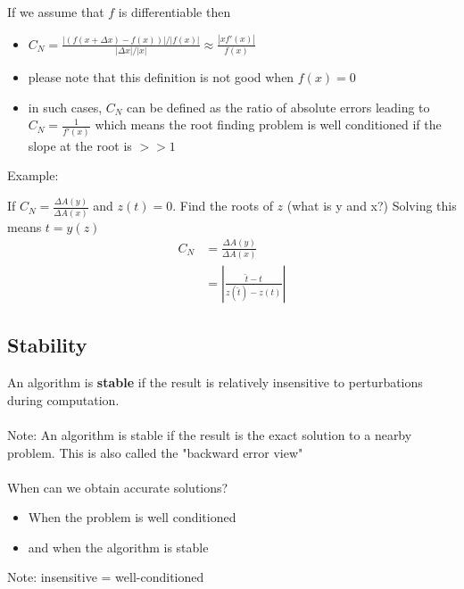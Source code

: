 \documentclass[12pt]{article}
\begin{document}
If we assume that $f$ is differentiable then

\begin{itemize}
    \item $C_N = \frac{|(f(x + \Delta x) - f(x))| / |f(x)|}{|
    \Delta x|/ |x|} \approx \frac{|xf'(x)|}{f(x)}$
    \item please note that this definition is not good when $f(x) = 0$
    \item in such cases, $C_N$ can be defined as the ratio of absolute errors leading to $C_N = \frac{1}{f'(x)}$ which means the root finding problem is well conditioned if the slope at the root is $>>1$
\end{itemize}

Example:

If $C_N = \frac{\Delta A (y)}{ \Delta A (x)}$ and $z(t) = 0$. Find the roots of $z$ (what is y and x?)
Solving this means $t = y(z)$
\begin{align*}
    C_N &= \frac{\Delta A (y)}{ \Delta A (x)}\\
    &= |\frac{\hat{t} - t}{z(\hat{t}) - z(t)}|
\end{align*}

\subsection{Stability}

An algorithm is \textbf{stable} if the result is relatively insensitive to perturbations during computation.
\\
\\
Note: An algorithm is stable if the result is the exact solution to a nearby problem. This is also called the "backward error view"
\\
\\
When can we obtain accurate solutions?
\begin{itemize}
    \item When the problem is well conditioned
    \item and when the algorithm is stable
\end{itemize}

Note: insensitive = well-conditioned
\end{document}
